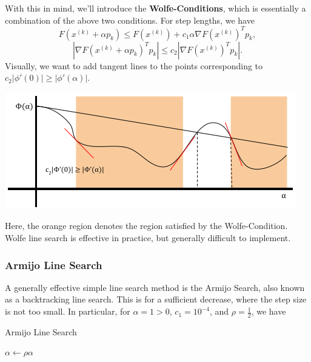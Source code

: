 \documentclass[letterpaper]{article}
\begin{document}
With this in mind, we'll introduce the \textbf{Wolfe-Conditions}, which is essentially a combination of the above two conditions. For step lengths, we have \[F(x^{(k)} + \alpha p_k) \leq F(x^{(k)}) + c_1 \alpha \nabla F(x^{(k)})^T p_k,\]
\[|\nabla F(x^{(k)} + \alpha p_k)^T p_k| \leq c_2 |\nabla F(x^{(k)})^T p_k|.\]
Visually, we want to add tangent lines to the points corresponding to $c_2 |\phi'(0)| \geq |\phi'(\alpha)|$.
\begin{center}
    \includegraphics[scale=0.7]{../assets/line_search_dec2.png}
\end{center}
Here, the orange region denotes the region satisfied by the Wolfe-Condition. Wolfe line search is effective in practice, but generally difficult to implement. 

\subsubsection{Armijo Line Search}
A generally effective simple line search method is the Armijo Search, also known as a backtracking line search. This is for a sufficient decrease, where the step size is not too small. In particular, for $\alpha = 1 > 0$, $c_1 = 10^{-4}$, and $\rho = \frac{1}{2}$, we have 
\begin{algorithm}[H]
    \caption{Armijo Line Search}
    \begin{algorithmic}[1]
            \State $\alpha \gets \rho \alpha$
        \EndWhile 
    \end{algorithmic}
\end{algorithm}
\end{document}
